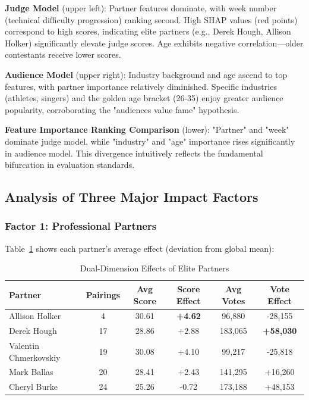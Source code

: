 \textbf{Judge Model} (upper left): Partner features dominate, with week number (technical difficulty progression) ranking second. High SHAP values (red points) correspond to high scores, indicating elite partners (e.g., Derek Hough, Allison Holker) significantly elevate judge scores. Age exhibits negative correlation---older contestants receive lower scores.

\textbf{Audience Model} (upper right): Industry background and age ascend to top features, with partner importance relatively diminished. Specific industries (athletes, singers) and the golden age bracket (26-35) enjoy greater audience popularity, corroborating the "audiences value fame" hypothesis.

\textbf{Feature Importance Ranking Comparison} (lower): "Partner" and "week" dominate judge model, while "industry" and "age" importance rises significantly in audience model. This divergence intuitively reflects the fundamental bifurcation in evaluation standards.



\subsection{Analysis of Three Major Impact Factors}

\subsubsection{Factor 1: Professional Partners}

Table~\ref{tab:partner_effect} shows each partner's average effect (deviation from global mean):

\begin{table}[h]
\centering
\small
\begin{tabular}{lccccc}
\hline
\textbf{Partner} & \textbf{Pairings} & \textbf{Avg Score} & \textbf{Score Effect} & \textbf{Avg Votes} & \textbf{Vote Effect} \\
\hline
Allison Holker & 4 & 30.61 & \textbf{+4.62} & 96,880 & -28,155 \\
Derek Hough & 17 & 28.86 & +2.88 & 183,065 & \textbf{+58,030} \\
Valentin Chmerkovskiy & 19 & 30.08 & +4.10 & 99,217 & -25,818 \\
Mark Ballas & 20 & 28.41 & +2.43 & 141,295 & +16,260 \\
Cheryl Burke & 24 & 25.26 & -0.72 & 173,188 & +48,153 \\
\hline
\end{tabular}
\caption{Dual-Dimension Effects of Elite Partners}
\label{tab:partner_effect}
\end{table}

